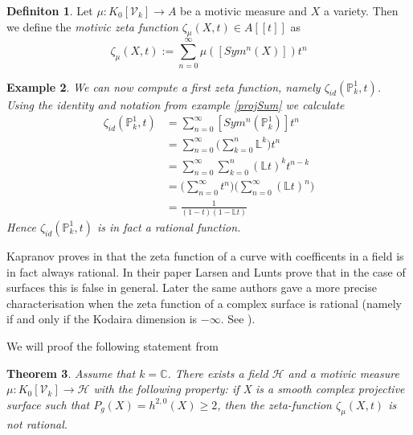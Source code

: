 \documentclass[11pt, a4paper, german]{article}
\theoremstyle{plain}
\newtheorem{theorem}{Theorem}
\newtheorem{example}[theorem]{Example}
\theoremstyle{definition}
\newtheorem{definition}[theorem]{Definiton}
\newcommand{\gring}[1][k]{K_0[\mathcal{V}_#1]}
\begin{document}
\begin{definition}
    Let $\mu: \gring \to A$ be a motivic measure and $X$ a variety. Then we define the \emph{motivic zeta function} 
    $\zeta_{\mu}(X,t) \in A[[t]]$ as
    \[
        \zeta_{\mu}(X,t) := \sum_{n=0}^\infty \mu([Sym^n(X)])t^n
    \]
\end{definition}

\begin{example}
    We can now compute a first zeta function, namely $\zeta_{id}(\mathbb{P}_k^1, t)$. Using the identity and notation from example \ref{projSum}
    we calculate
    \begin{align*}
        \zeta_{id}(\mathbb{P}_k^1, t) & = \sum_{n=0}^\infty [Sym^n({\mathbb{P}_k^1})]t^n \\
                                      & = \sum_{n=0}^\infty \big(\sum_{k=0}^n \mathbb{L}^k\big) t^n \\
                                      & = \sum_{n=0}^\infty \sum_{k=0}^n (\mathbb{L}t)^k t^{n-k} \\
                                      & = \Big( \sum_{n=0}^\infty t^n \Big) \Big( \sum_{n=0}^\infty (\mathbb{L}t)^n \Big) \\
                                      & = \frac{1}{(1-t)(1-\mathbb{L}t)}
    \end{align*}
    Hence $\zeta_{id}(\mathbb{P}_k^1, t)$ is in fact a rational function.
\end{example}

Kapranov proves in \cite{kapranov} that the zeta function of a curve with coefficents in a field is in fact always rational. 
In their paper \cite{MR1996804} Larsen and Lunts prove that in the case of surfaces this is false in general.
Later the same authors gave a more precise characterisation when the zeta function of a complex surface is rational 
(namely if and only if the Kodaira dimension is $-\infty$. See \cite{LL2}).

We will proof the following statement from \cite{MR1996804}
\begin{theorem}
    Assume that $k = \mathbb{C}$. There exists a field $\mathcal{H}$ and a motivic measure $\mu: \gring \to \mathcal{H}$ with the following
    property: if X is a smooth complex projective surface such that $P_g(X)=h^{2,0}(X) \ge 2$, then the zeta-function $\zeta_{\mu}(X,t)$
    is not rational.
\end{theorem}
\end{document}
